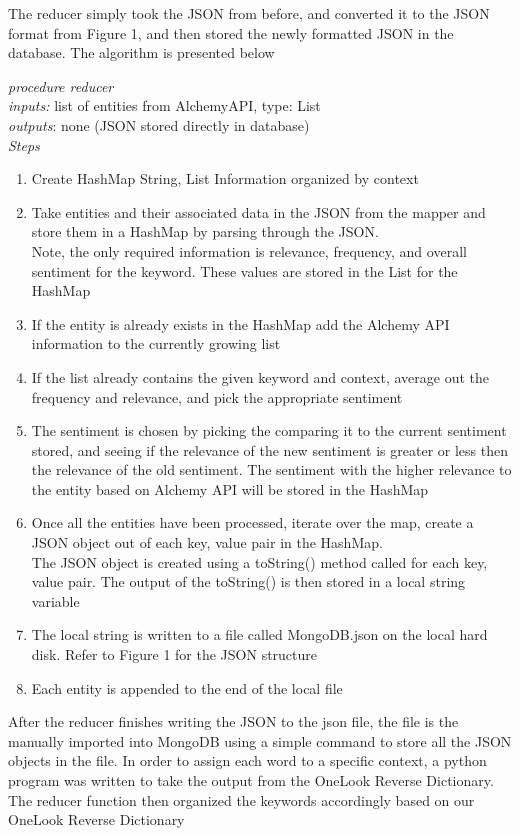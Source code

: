 \documentclass[conference]{IEEEtran}
\begin{document}
The reducer simply took the JSON from before, and converted it to the JSON format from Figure 1, and then stored the newly formatted JSON in the database. The algorithm is presented below

\textit{procedure reducer} \\
\textit{inputs:} list of entities from AlchemyAPI, type: List  \\
\textit{outputs}: none (JSON stored directly in database) \\
\textit{Steps} \\
\begin{enumerate} 
\item Create HashMap String, List Information organized by context
\item Take entities and their associated data in the JSON from the mapper and store them in a HashMap by parsing through the JSON. \\ \indent Note, the only required information is relevance, frequency, and overall sentiment for the keyword. These values are stored in the List for the HashMap
\item If the entity is already exists in the HashMap add the Alchemy API information to the currently growing list 
\item If the list already contains the given keyword and context, average out the frequency and relevance, and pick the appropriate sentiment 
\item The sentiment is chosen by picking the comparing it to the current sentiment stored, and seeing if the relevance of the new sentiment is greater or less then the relevance of the old sentiment. The sentiment with the higher relevance to the entity based on Alchemy API will be stored in the HashMap 
\item Once all the entities have been processed, iterate over the map, create a JSON object out of each key, value pair in the HashMap. \\ \indent The JSON object is created using a toString() method called for each key, value pair. The output of the toString() is then stored in a local string variable 
\item The local string is written to a file called MongoDB.json on the local hard disk. Refer to Figure 1 for the JSON structure 
\item Each entity is appended to the end of the local file 
\end{enumerate}

After the reducer finishes writing the JSON to the json file, the file is the manually imported into MongoDB using a simple command to store all the JSON objects in the file. In order to assign each word to a specific context, a python program was written to take the output from the OneLook Reverse Dictionary. The reducer function then organized the keywords accordingly based on our OneLook Reverse Dictionary 
\end{document}
